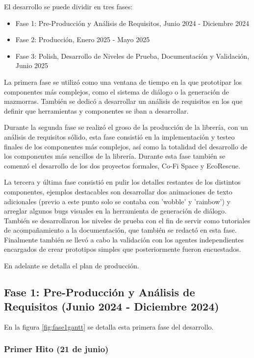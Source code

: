 El desarrollo se puede dividir en tres fases: 
\begin{itemize}
	\item Fase 1: Pre-Producción y Análisis de Requisitos, Junio 2024 - Diciembre 2024
	\item Fase 2: Producción, Enero 2025 - Mayo 2025
	\item Fase 3: Polish, Desarrollo de Niveles de Prueba, Documentación y Validación, Junio 2025
\end{itemize}

La primera fase se utilizó como una ventana de tiempo en la que prototipar los componentes más complejos, como el sistema de diálogo o la generación de
 mazmorras. También se dedicó a desarrollar un análisis de requisitos en los que definir que herramientas y componentes se iban a desarrollar. 
 
Durante la segunda fase se realizó el groso de la producción de la librería, con un análisis de requisitos sólido, esta fase consistió en la implementación y testeo 
finales de los componentes más complejos, así como la totalidad del desarrollo de los componentes más sencillos de la librería. Durante esta fase también se comenzó el 
desarrollo de los dos proyectos formales, Co-Fi Space\cite{CoFiSpace} y EcoRescue\cite{EcoRescue}. 

La tercera y última fase consistió en pulir los detalles restantes de los distintos componentes, ejemplos destacables son desarrollar dos animaciones de texto adicionales 
(previo a este punto solo se contaba con 'wobble' y 'rainbow') y arreglar algunos bugs visuales en la herramienta de generación de diálogo. También se desarrollaron los niveles 
de prueba con el fin de servir como tutoriales de acompañamiento a la documentación, que también se redactó en esta fase. Finalmente también se llevó a cabo la validación 
con los agentes independientes encargados de crear prototipos simples que posteriormente fueron encuestados. 

En adelante se detalla el plan de producción.

\subsection{Fase 1: Pre-Producción y Análisis de Requisitos (Junio 2024 - Diciembre 2024)}

En la figura \ref{fig:fase1gantt} se detalla esta primera fase del desarrollo.

\subsubsection{Primer Hito (21 de junio)}

